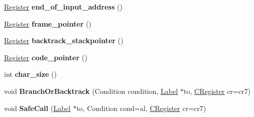 \begin{DoxyCompactItemize}
\item 
\hyperlink{structv8_1_1internal_1_1_register}{Register} {\bfseries end\+\_\+of\+\_\+input\+\_\+address} ()\hypertarget{classv8_1_1internal_1_1_reg_exp_macro_assembler_p_p_c_ac592d2916a1d9abe1afba077cc2e21a5}{}\label{classv8_1_1internal_1_1_reg_exp_macro_assembler_p_p_c_ac592d2916a1d9abe1afba077cc2e21a5}

\item 
\hyperlink{structv8_1_1internal_1_1_register}{Register} {\bfseries frame\+\_\+pointer} ()\hypertarget{classv8_1_1internal_1_1_reg_exp_macro_assembler_p_p_c_afe99dd72a111629f2c1d6f4337115670}{}\label{classv8_1_1internal_1_1_reg_exp_macro_assembler_p_p_c_afe99dd72a111629f2c1d6f4337115670}

\item 
\hyperlink{structv8_1_1internal_1_1_register}{Register} {\bfseries backtrack\+\_\+stackpointer} ()\hypertarget{classv8_1_1internal_1_1_reg_exp_macro_assembler_p_p_c_aedb820df4f5c8df071bc3df240baab6e}{}\label{classv8_1_1internal_1_1_reg_exp_macro_assembler_p_p_c_aedb820df4f5c8df071bc3df240baab6e}

\item 
\hyperlink{structv8_1_1internal_1_1_register}{Register} {\bfseries code\+\_\+pointer} ()\hypertarget{classv8_1_1internal_1_1_reg_exp_macro_assembler_p_p_c_a7ab3f7fcf5fec298cb6c271e93894b4e}{}\label{classv8_1_1internal_1_1_reg_exp_macro_assembler_p_p_c_a7ab3f7fcf5fec298cb6c271e93894b4e}

\item 
int {\bfseries char\+\_\+size} ()\hypertarget{classv8_1_1internal_1_1_reg_exp_macro_assembler_p_p_c_a121cd22e4b2988ed3c933f98577c6860}{}\label{classv8_1_1internal_1_1_reg_exp_macro_assembler_p_p_c_a121cd22e4b2988ed3c933f98577c6860}

\item 
void {\bfseries Branch\+Or\+Backtrack} (Condition condition, \hyperlink{classv8_1_1internal_1_1_label}{Label} $\ast$to, \hyperlink{structv8_1_1internal_1_1_c_register}{C\+Register} cr=cr7)\hypertarget{classv8_1_1internal_1_1_reg_exp_macro_assembler_p_p_c_a8d08124a1fd64b00d323f75803c900f7}{}\label{classv8_1_1internal_1_1_reg_exp_macro_assembler_p_p_c_a8d08124a1fd64b00d323f75803c900f7}

\item 
void {\bfseries Safe\+Call} (\hyperlink{classv8_1_1internal_1_1_label}{Label} $\ast$to, Condition cond=al, \hyperlink{structv8_1_1internal_1_1_c_register}{C\+Register} cr=cr7)\hypertarget{classv8_1_1internal_1_1_reg_exp_macro_assembler_p_p_c_ae170664f4b9eb6adfba8b57307f47b7c}{}\label{classv8_1_1internal_1_1_reg_exp_macro_assembler_p_p_c_ae170664f4b9eb6adfba8b57307f47b7c}


\end{DoxyCompactItemize}
